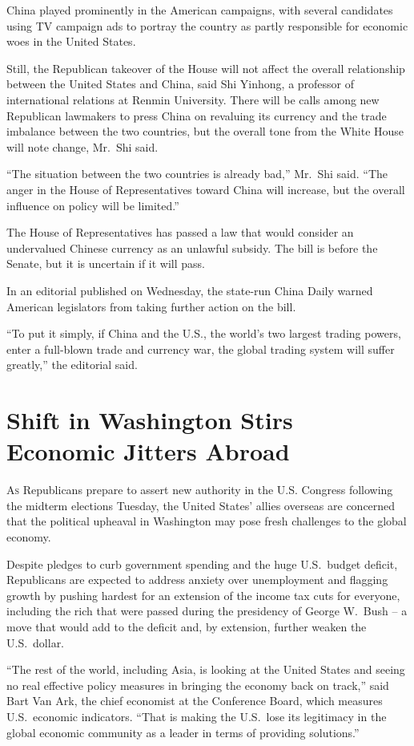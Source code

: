 ﻿\documentclass[12pt]{article}
\begin{document}
China played prominently in the American campaigns, with several candidates using TV campaign ads to
portray the country as partly responsible for economic woes in the United States.

Still, the Republican takeover of the House will not affect the overall relationship between the
United States and China, said Shi Yinhong, a professor of international relations at Renmin
University. There will be calls among new Republican lawmakers to press China on revaluing its
currency and the trade imbalance between the two countries, but the overall tone from the White
House will note change, Mr.~Shi said.

``The situation between the two countries is already bad,'' Mr.~Shi said. ``The anger in the House
of Representatives toward China will increase, but the overall influence on policy will be
limited.''

The House of Representatives has passed a law that would consider an undervalued Chinese currency as
an unlawful subsidy. The bill is before the Senate, but it is uncertain if it will pass.

In an editorial published on Wednesday, the state-run China Daily warned American legislators from
taking further action on the bill.

``To put it simply, if China and the U.S., the world's two largest trading powers, enter a
full-blown trade and currency war, the global trading system will suffer greatly,'' the editorial
said.

\section{Shift in Washington Stirs Economic Jitters Abroad}

\lettrine{A}{s} Republicans prepare to assert new authority in the U.S.
Congress following the midterm elections Tuesday, the United States' allies overseas are concerned
that the political upheaval in Washington may pose fresh challenges to the global economy.

Despite pledges to curb government spending and the huge U.S.~budget deficit, Republicans are
expected to address anxiety over unemployment and flagging growth by pushing hardest for an
extension of the income tax cuts for everyone, including the rich that were passed during the
presidency of George W.~Bush -- a move that would add to the deficit and, by extension, further
weaken the U.S.~dollar.

``The rest of the world, including Asia, is looking at the United States and seeing no real
effective policy measures in bringing the economy back on track,'' said Bart Van Ark, the chief
economist at the Conference Board, which measures U.S.~economic indicators. ``That is making the
U.S.~lose its legitimacy in the global economic community as a leader in terms of providing
solutions.''
\end{document}

